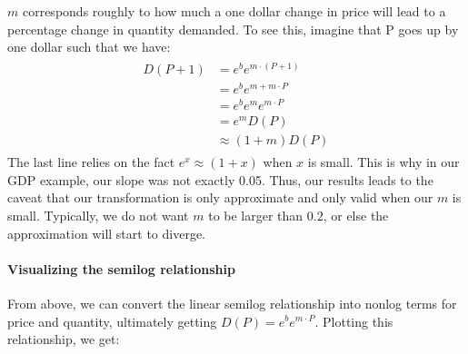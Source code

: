\documentclass[letterpaper,10pt,english]{jupyterBook}
\begin{document}
\sphinxAtStartPar
\(m\) corresponds roughly to how much a one dollar change in price will lead to a percentage change in quantity demanded. To see this, imagine that P goes up by one dollar such that we have:
\begin{equation*}
\begin{split}
\begin{align*}
D(P+1) &= e^be^{m \cdot (P+1) }  \\
&= e^be^{m + m \cdot P }\\
&= e^be^me^{m \cdot P }\\
&= e^mD(P) \\
&\approx (1+m)D(P)
\end{align*}\end{split}
\end{equation*}
\sphinxAtStartPar
The last line relies on the fact \(e^{x} \approx (1+x)\) when \(x\) is small. This is why in our GDP example, our slope was not exactly 0.05. Thus, our results leads to the caveat that our transformation is only approximate and only valid when our \(m\) is small. Typically, we do not want \(m\) to be larger than \(0.2\), or else the approximation will start to diverge.


\paragraph{Visualizing the semi\sphinxhyphen{}log relationship}
\label{\detokenize{content/01-demand/03-log-log:visualizing-the-semi-log-relationship}}
\sphinxAtStartPar
From above, we can convert the linear semi\sphinxhyphen{}log relationship into non\sphinxhyphen{}log terms for price and quantity, ultimately getting \(D(P) = e^be^{m\cdot P}\). Plotting this relationship, we get:

\noindent{}
\end{document}
